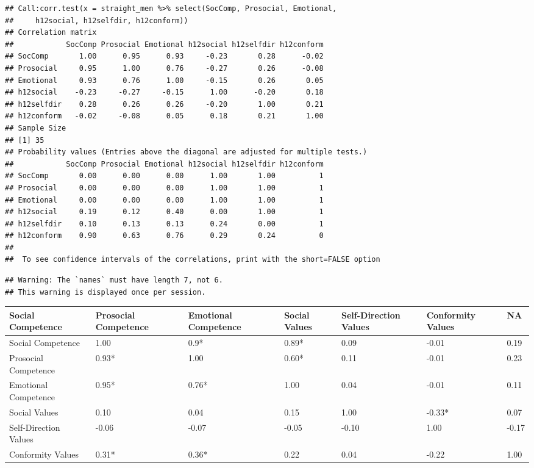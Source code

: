 \documentclass[man]{apa6}
\begin{document}
\begin{verbatim}
## Call:corr.test(x = straight_men %>% select(SocComp, Prosocial, Emotional, 
##     h12social, h12selfdir, h12conform))
## Correlation matrix 
##            SocComp Prosocial Emotional h12social h12selfdir h12conform
## SocComp       1.00      0.95      0.93     -0.23       0.28      -0.02
## Prosocial     0.95      1.00      0.76     -0.27       0.26      -0.08
## Emotional     0.93      0.76      1.00     -0.15       0.26       0.05
## h12social    -0.23     -0.27     -0.15      1.00      -0.20       0.18
## h12selfdir    0.28      0.26      0.26     -0.20       1.00       0.21
## h12conform   -0.02     -0.08      0.05      0.18       0.21       1.00
## Sample Size 
## [1] 35
## Probability values (Entries above the diagonal are adjusted for multiple tests.) 
##            SocComp Prosocial Emotional h12social h12selfdir h12conform
## SocComp       0.00      0.00      0.00      1.00       1.00          1
## Prosocial     0.00      0.00      0.00      1.00       1.00          1
## Emotional     0.00      0.00      0.00      1.00       1.00          1
## h12social     0.19      0.12      0.40      0.00       1.00          1
## h12selfdir    0.10      0.13      0.13      0.24       0.00          1
## h12conform    0.90      0.63      0.76      0.29       0.24          0
## 
##  To see confidence intervals of the correlations, print with the short=FALSE option
\end{verbatim}

\begin{verbatim}
## Warning: The `names` must have length 7, not 6.
## This warning is displayed once per session.
\end{verbatim}

\begin{tabular}{l|l|l|l|l|l|l}
\hline
Social Competence & Prosocial Competence & Emotional Competence & Social Values & Self-Direction Values & Conformity Values & NA\\
\hline
Social Competence & 1.00 & 0.9* & 0.89* & 0.09 & -0.01 & 0.19\\
\hline
Prosocial Competence & 0.93* & 1.00 & 0.60* & 0.11 & -0.01 & 0.23\\
\hline
Emotional Competence & 0.95* & 0.76* & 1.00 & 0.04 & -0.01 & 0.11\\
\hline
Social Values & 0.10 & 0.04 & 0.15 & 1.00 & -0.33* & 0.07\\
\hline
Self-Direction Values & -0.06 & -0.07 & -0.05 & -0.10 & 1.00 & -0.17\\
\hline
Conformity Values & 0.31* & 0.36* & 0.22 & 0.04 & -0.22 & 1.00\\
\hline
\end{tabular}
\end{document}
